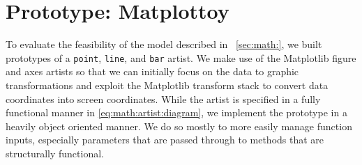 \documentclass[../main.tex]{subfiles}
\begin{document}
\section{Prototype: Matplottoy}
\label{sec:implementation}
To evaluate the feasibility of the model described in ~\autoref{sec:math:}, we built prototypes of a \texttt{point}, \texttt{line}, and \texttt{bar} artist. We make use of the Matplotlib figure and axes artists \cite{hunterArchitectureOpenSource,hunterMatplotlib2DGraphics2007} so that we can initially focus on the data to graphic transformations and exploit the Matplotlib transform stack to convert data coordinates into screen coordinates. While the artist is specified in a fully functional manner in \autoref{eq:math:artist:diagram}, we implement the  prototype in a heavily object oriented manner. We do so mostly to more easily manage function inputs, especially parameters that are passed through to methods that are structurally functional. 
\end{document}

